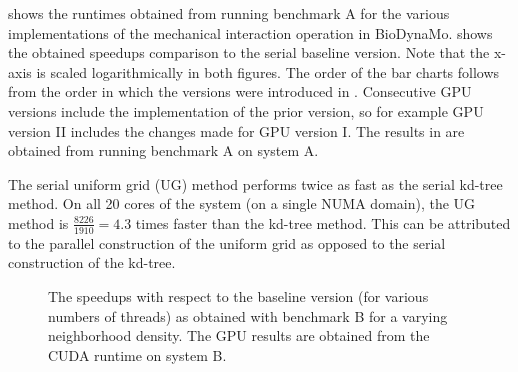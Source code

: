 \documentclass[conference]{IEEEtran}
\begin{document}
\par {} shows the runtimes obtained from running benchmark A for the various implementations of the mechanical interaction operation in BioDynaMo.
 shows the obtained speedups comparison to the serial baseline version.
Note that the x-axis is scaled logarithmically in both figures.
The order of the bar charts follows from the order in which the versions were introduced in .
Consecutive GPU versions include the implementation of the prior version, so for example GPU version II includes the changes made for GPU version I.
The results in  are obtained from running benchmark A on system A.

\par The serial uniform grid (UG) method performs twice as fast as the serial kd-tree method.
On all 20 cores of the system (on a single NUMA domain), the UG method is $\frac{8226}{1910} = 4.3$ times faster than the kd-tree method.
This can be attributed to the parallel construction of the uniform grid as opposed to the serial construction of the kd-tree.

\begin{figure}[!t]
    \centering
    
    \caption{The speedups with respect to the baseline version (for various numbers of threads) as obtained with benchmark B for a varying neighborhood density. The GPU results are obtained from the CUDA runtime on system B.}
    \label{fig:benchmarkB_speedups}
\end{figure}
\end{document}
